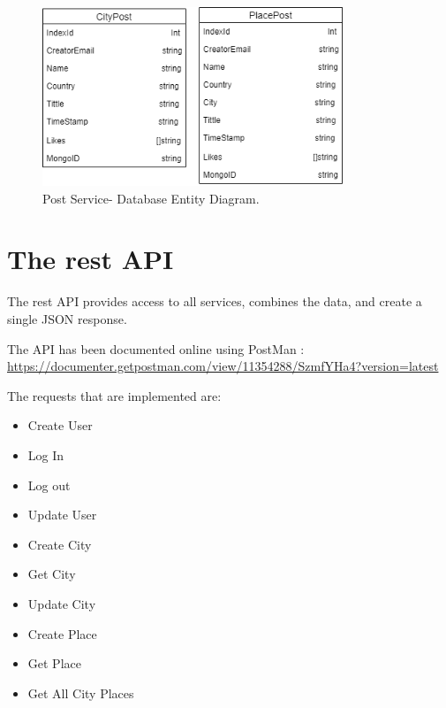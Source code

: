 \begin{figure}[H]
	\begin{center}
		\includegraphics[width=90mm,scale=1]{img/post/post-db-entity.png}
		\caption{Post Service- Database Entity Diagram.}
		\label{post:dbentity}
	\end{center}
\end{figure}

\section{The rest API}
 \indent
 \indent
The rest API provides access to all services, combines the data, and create a single JSON response. 

The API has been documented online using PostMan : \url{https://documenter.getpostman.com/view/11354288/SzmfYHa4?version=latest} 

The requests that are implemented are:
\begin{itemize}
	

\item Create User
\item Log In
\item  Log out 
\item  Update User
\item  Create City
\item  Get City
\item  Update City
\item  Create Place
\item  Get Place
\item  Get All City Places

\end{itemize}
